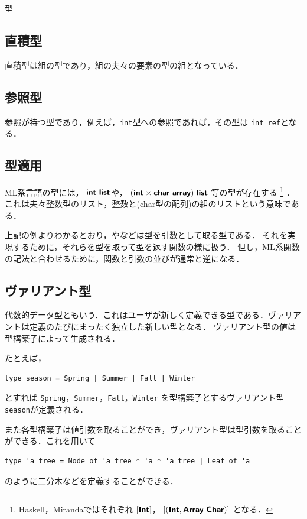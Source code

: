 \documentclass[a4paper,titlepage,report,disablejfam]{jsbook}
\begin{document}
\begin{resbonsiblesection}{型}{\sakamoto}
\subsection{直積型}\label{ssc:type-tuple}
直積型は組の型であり，組の夫々の要素の型の組となっている．

\subsection{参照型}\label{ssc:type-reference}
参照が持つ型であり，例えば，\lstinline|int|型への参照であれば，その型は
\lstinline|int ref|となる．

\subsection{型適用}\label{ssc:type-apply}
ML系言語の型には，
$\typename{int}\ \typename{list}$や，
$(\typename{int}\times\typename{char}\ \typename{array})\ \typename{list}$
等の型が存在する
\footnote{
    Haskell，Mirandaではそれぞれ
    $[\text{\sffamily\bfseries Int}]$，
    $[(\typename{Int}, \typename{Array}\ \typename{Char})]$
    となる．
    }
．
これは夫々整数型のリスト，整数と(char型の配列)の組のリストという意味である．

上記の例よりわかるとおり，やなどは型を引数として取る型である．
それを実現するために，それらを型を取って型を返す関数の様に扱う．
但し，ML系関数の記法と合わせるために，関数と引数の並びが通常と逆になる．

\subsection{ヴァリアント型}\label{ssc:type-variant}
代数的データ型ともいう．これはユーザが新しく定義できる型である．ヴァリア
ントは定義のたびにまったく独立した新しい型となる．
ヴァリアント型の値は型構築子によって生成される．

たとえば，
\begin{lstlisting}
type season = Spring | Summer | Fall | Winter
\end{lstlisting}
とすれば
\lstinline|Spring|，\lstinline|Summer|，\lstinline|Fall|，\lstinline|Winter|
を型構築子とするヴァリアント型\lstinline|season|が定義される．

また各型構築子は値引数を取ることができ，ヴァリアント型は型引数を取ること
ができる．これを用いて
\begin{lstlisting}
type 'a tree = Node of 'a tree * 'a * 'a tree | Leaf of 'a
\end{lstlisting}
のように二分木などを定義することができる．


\end{resbonsiblesection}
\end{document}
